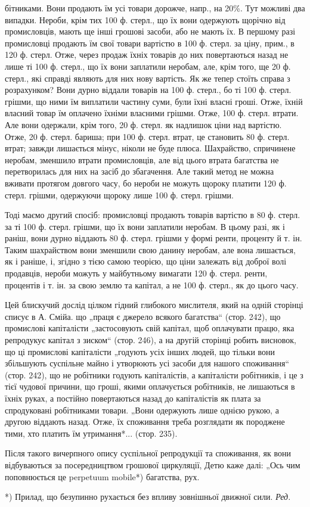 \parcont{}  %
бітниками. Вони продають їм усі товари дорожче, напр., на 20\%. Тут можливі два випадки. Нероби, крім
тих 100 ф. стерл., що їх вони одержують щорічно від промисловців, мають ще інші грошові засоби, або
не мають їх. В першому разі промисловці продають їм свої товари вартістю в 100 ф. стерл. за ціну,
прим., в 120 ф. стерл. Отже, через продаж їхніх товарів до них повертаються назад не лише ті 100 ф.
стерл., що їх вони заплатили неробам, але, крім того, ще 20 ф. стерл., які справді являють для них
нову вартість. Як же тепер стоїть справа з розрахунком? Вони дурно віддали товарів на 100 ф. стерл.,
бо ті 100 ф. стерл. грішми, що ними їм виплатили частину суми, були їхні власні гроші. Отже, їхній
власний товар їм оплачено їхніми власними грішми. Отже, 100 ф. стерл. втрати. Але вони одержали,
крім того, 20 ф. стерл. як надлишок ціни над вартістю. Отже, 20 ф. стерл. бариша; при 100 ф. стерл.
втрат, це становить 80 ф. стерл. втрат; завжди лишається мінус, ніколи не буде плюса. Шахрайство,
спричинене неробам, зменшило втрати промисловців, але від цього втрата багатства не перетворилась
для них на засіб до збагачення. Але такий метод не можна вживати протягом довгого часу, бо нероби не
можуть щороку платити 120 ф. стерл. грішми, одержуючи щороку лише 100 ф. стерл. грішми.

Тоді маємо другий спосіб: промисловці продають товарів вартістю в 80 ф. стерл. за ті 100 ф. стерл.
грішми, що їх вони заплатили неробам. В цьому разі, як і раніш, вони дурно віддають 80 ф. стерл.
грішми у формі ренти, проценту й т. ін. Таким шахрайством вони зменшили свою данину неробам, але
вона лишається, як і раніше, і, згідно з тією самою теорією, що ціни залежать від доброї волі
продавців, нероби можуть у майбутньому вимагати 120 ф. стерл. ренти, процентів і т. ін. за свою
землю та капітал, а не 100 ф. стерл., як до цього часу.

Цей блискучий дослід цілком гідний глибокого мислителя, який на одній сторінці списує в А. Смійа. що
„праця є джерело всякого багатства“ (стор. 242), що промислові капіталісти „застосовують свій
капітал, щоб оплачувати працю, яка репродукує капітал з зиском“ (стор. 246), а на другій сторінці
робить висновок, що ці промислові капіталісти „годують
усіх інших людей, що тільки вони збільшують суспільне майно і утворюють усі засоби для нашого
споживання“ (стор. 242), що не робітники годують капіталістів, а капіталісти робітників, і це з тієї
чудової причини, що гроші, якими оплачується робітників, не лишаються в їхніх руках, а постійно
повертаються назад до капіталістів як плата за спродуковані робітниками товари. „Вони одержують лише
однією рукою, а другою віддають назад. Отже, їх споживання треба розглядати як породжене тими, хто
платить їм утримання*... (стор. 235).

Після такого вичерпного опису суспільної репродукції та споживання, як вони відбуваються за
посередництвом грошової циркуляції, Детю каже далі: „Ось чим поповнюється це perpetuum mobile*)
багатства, рух.

*) Прилад, що безупинно рухається без впливу зовнішньої движної сили. \emph{Ред.}
\parbreak{}  %
